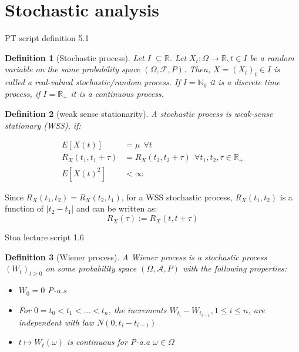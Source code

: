 \documentclass[%
thesis=student,%
coverpage=false,%
titlepage=false,%
headmarks=true, %
german,%
font=libertine, %
math=newpxtx, %
BCOR=5mm,%
coverBCOR=11mm%
]{tumbook}
\newtheorem{definition}{Definition}[section]
\begin{document}
\section{Stochastic analysis}

PT script definition 5.1
\begin{definition}[Stochastic process]
Let I $\subseteq \mathbb{R}$. Let $X_{t}:\Omega \rightarrow \mathbb{R}, t \in I$ be a random variable on the same probability space $(\Omega,\mathcal{F},P)$. Then, $X = (X_{t})_{t} \in I$ is called a real-valued stochastic/random process. If $I = \mathbb{N}_{0}$ it is a discrete time process, if  $I = \mathbb{R}_{+}$ it is a continuous process.
\end{definition}


\begin{definition}[weak sense stationarity]
A stochastic process is weak-sense stationary (WSS), if:

\begin{subequations}
    \begin{align}
        E[X(t)] &= \mu \ \ \forall t \\
        R_{X}(t_{1},t_{1} + \tau) &= R_{X}(t_{2},t_{2} + \tau) \ \ \forall t_{1},t_{2},\tau \in \mathbb{R}_{+} \\
        E[X(t)^2]&<\infty
    \end{align}
\end{subequations}   
\end{definition}

Since $R_{X}(t_{1},t_{2}) = R_{X}(t_{2},t_{1})$, for a WSS stochastic process, $R_{X}(t_{1},t_{2})$ is a function of $\lvert t_{2} - t_{1} \rvert$ and can be written as:
\[
R_{X}(\tau) := R_{X}(t,t + \tau)
\]

Stoa lecture script 1.6
\begin{definition}[Wiener process]
A Wiener process is a stochastic process $(W_{t})_{t\geq 0}$ on some probability space $(\Omega,\mathcal{A},P)$ with the following properties: 
\begin{itemize}
    \item $W_{0} = 0$ P-a.s
    \item For $0 = t_{0} < t_{1} < ... < t_{n}$, the increments $W_{t_{i}} - W_{t_{i-1}}, 1 \leq i \leq n$, are independent with law $N(0,t_{i}-t_{i-1})$
    \item $t \mapsto W_{t}(\omega)$ is continuous for P-a.a $\omega \in \Omega$
\end{itemize}
\end{definition}
\end{document}
